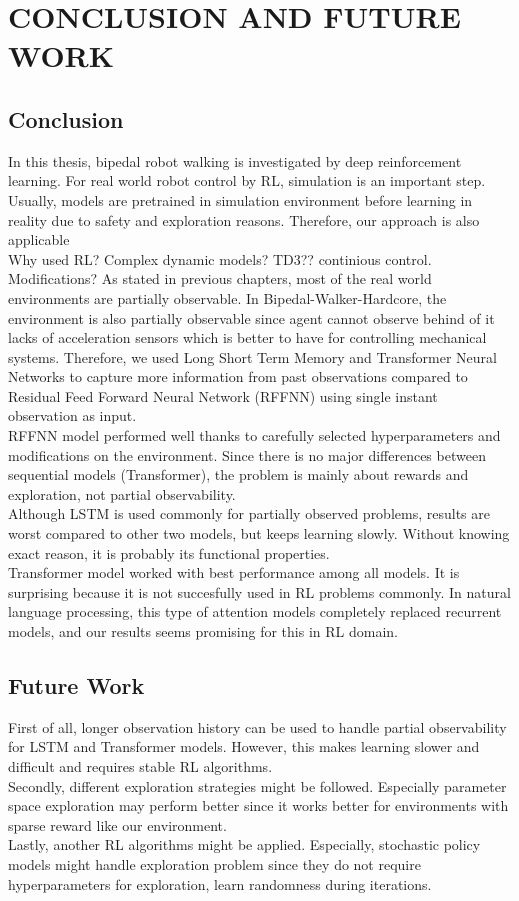 \chapter{CONCLUSION AND FUTURE WORK}
\label{chap:conclusion}
\section{Conclusion}
In this thesis, bipedal robot walking is investigated by deep  reinforcement learning. For real world robot control by RL, simulation is an important step. Usually, models are pretrained in simulation environment before learning in reality due to safety and exploration reasons.  Therefore, our approach is also applicable \\
Why used RL? Complex dynamic models?
TD3?? continious control.
Modifications?
As stated in previous chapters, most of the real world environments are partially observable. In Bipedal-Walker-Hardcore, the environment is also partially observable since agent cannot observe behind of it lacks of acceleration sensors which is better to have for controlling mechanical systems. Therefore, we used Long Short Term Memory and Transformer Neural Networks to capture more information from past observations compared to Residual Feed Forward Neural Network (RFFNN) using single instant observation as input. \\
RFFNN model performed well thanks to carefully selected hyperparameters and modifications on the environment. Since there is no major differences between sequential models (Transformer), the problem is mainly about rewards and exploration, not partial observability. \\
Although LSTM is used commonly for partially observed problems, results are worst compared to other two models, but keeps learning slowly. Without knowing exact reason, it is probably its functional properties. \\
Transformer model worked with best performance among all models. It is surprising because it is not succesfully used in RL problems commonly. In natural language processing, this type of attention models completely replaced recurrent models, and our results seems promising for this in RL domain. \\
\section{Future Work}
First of all, longer observation history can be used to handle partial observability for LSTM and Transformer models. However, this makes learning slower and difficult and requires stable RL algorithms. \\
Secondly, different exploration strategies might be followed. Especially parameter space exploration \cite{plappert_parameter_2018} may perform better since it works better for environments with sparse reward like our environment. \\
Lastly, another RL algorithms might be applied. Especially, stochastic policy models might handle exploration problem since they do not require hyperparameters for exploration, learn randomness during iterations.